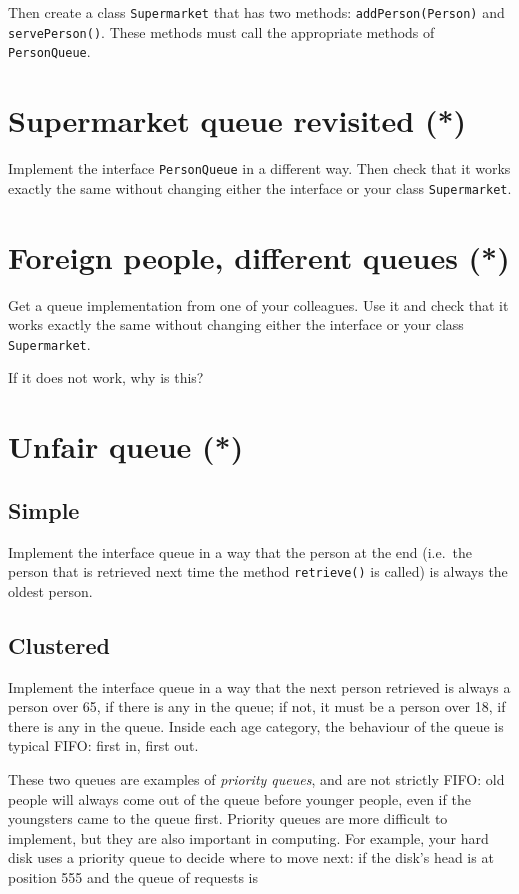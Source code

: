 \documentclass{article}
\begin{document}
Then create a class \verb+Supermarket+ that has two methods:
\verb+addPerson(Person)+ and \verb+servePerson()+. These methods must
call the appropriate methods of \verb+PersonQueue+. 

\section{Supermarket queue revisited (*)}
\label{sec:superm-queue-revis}

Implement the interface \verb+PersonQueue+ in a different way. Then check that it
works exactly the same without changing either the interface or your
class \verb+Supermarket+. 

\section{Foreign people, different queues (*)}
\label{sec:fore-people-diff}

Get a queue implementation from one of your colleagues. Use it and
check that it works exactly the same without changing either the
interface or your class \verb+Supermarket+. 

If it does not work, why is this?

\section{Unfair queue (*)}
\label{sec:unfair-queue-}

\subsection{Simple}
\label{sec:simple}

Implement the interface queue in a way that the person at the end
(i.e.~the person that is retrieved next time the method
\verb+retrieve()+ is called) is always the oldest person. 

\subsection{Clustered}
\label{sec:clustered}

Implement the interface queue in a way that the next person retrieved
is always a person over 65, if there is any in the queue; if not, it
must be a person over 18, if there is any in the queue. Inside each
age category, the behaviour of the queue is typical FIFO: first in,
first out. 

These two queues are examples of \emph{priority queues}, and are not
strictly FIFO: old people will always come out of the queue before
younger people, even if the youngsters came to the queue
first. Priority queues are more difficult to implement, but they are
also important in computing. For example, your hard disk uses a
priority queue to decide where to move next: if the disk's head is at
position 555 and the queue of requests is
\end{document}
